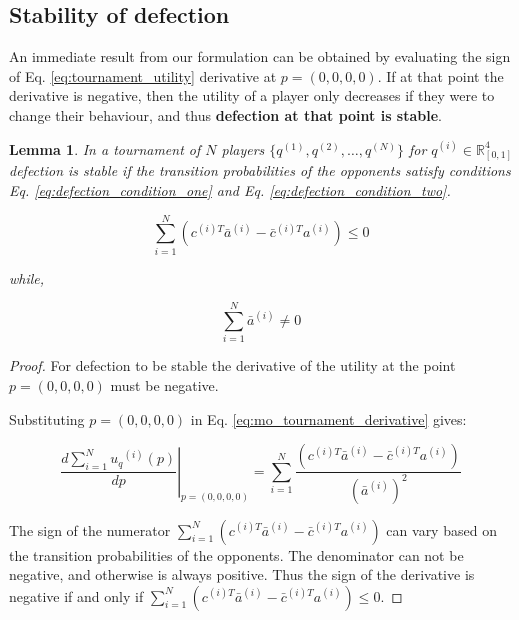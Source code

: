 \documentclass[9pt,twocolumn,twoside,lineno]{pnas-new}
\newcommand{\R}{\mathbb{R}}
\newtheorem{lemma}[theorem]{Lemma}
\begin{document}
\subsection*{Stability of defection}\label{subsection:stability_defection}

An immediate result from our formulation can be
obtained by evaluating the sign of Eq. \ref{eq:tournament_utility} derivative
at \(p=(0, 0, 0, 0)\). If at that point the
derivative is negative, then the utility of a player only decreases if they were
to change their behaviour, and thus \textbf{defection at that point is stable}.

\begin{lemma}\label{lemma:stability_of_defection}
    In a tournament of \(N\) players \(\{q^{(1)}, q^{(2)}, \dots, q^{(N)} \}\)
    for \(q^{(i)} \in \R_{[0, 1]} ^ 4\)
    defection is stable if the transition probabilities of the
    opponents satisfy conditions Eq. \ref{eq:defection_condition_one} and Eq. \ref{eq:defection_condition_two}.

    \begin{equation}\label{eq:defection_condition_one}
        \sum_{i=1} ^ N (c^{(i)T} \bar{a}^{(i)} - \bar{c}^{(i)T} a^{(i)}) \leq 0
    \end{equation}

    while,

    \begin{equation}\label{eq:defection_condition_two}
        \sum_{i=1} ^ N \bar{a}^{(i)} \neq 0
    \end{equation}
\end{lemma}

\begin{proof}
    For defection to be stable the derivative of the utility
    at the point \(p = (0, 0, 0, 0)\) must be negative.

    Substituting \(p = (0, 0, 0, 0)\) in
    Eq. \ref{eq:mo_tournament_derivative} gives:

    \begin{equation}
        \left.\frac{d\sum\limits_{i=1} ^ {N} {u_q}^{(i)} (p)}{dp} \right\rvert_{p=(0,0,0,0)} =
    \sum_{i=1} ^ N \frac{(c^{(i)T} \bar{a}^{(i)} - \bar{c}^{(i)T} a^{(i)})}
    {(\bar{a}^{(i)})^2}
    \end{equation}

    The sign of the numerator \( \displaystyle\sum_{i=1} ^ N (c^{(i)T} \bar{a}^{(i)} - \bar{c}^{(i)T} a^{(i)})\)
    can vary based on the transition probabilities of the opponents.
    The denominator can not be negative, and otherwise is always positive.
    Thus the sign of the derivative is negative if and only if
    \( \displaystyle\sum_{i=1} ^ N (c^{(i)T} \bar{a}^{(i)} - \bar{c}^{(i)T} a^{(i)}) \leq 0\).
\end{proof}
\end{document}
